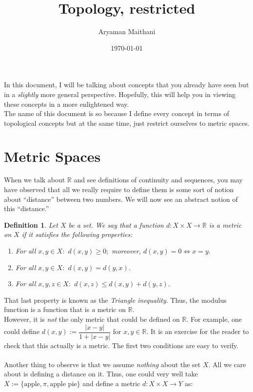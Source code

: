 \documentclass[12pt]{article}
\title{Topology, restricted}
\author{Aryaman Maithani}
\date{\today}
\newtheorem{defn}{Definition}
\newcounter{exercise}
\begin{document}
\maketitle
\hrulefill

In this document, I will be talking about concepts that you already have seen but in a \emph{slightly} more general perspective. Hopefully, this will help you in viewing these concepts in a more enlightened way.\\
The name of this document is so because I define every concept in terms of topological concepts but at the same time, just restrict ourselves to metric spaces.\\
\section{Metric Spaces}
	When we talk about $\mathbb{R}$ and see definitions of continuity and sequences, you may have observed that all we really require to define them is some sort of notion about ``distance'' between two numbers. We will now see an abstract notion of this ``distance.''
	\begin{defn}
		Let $X$ be a set. We say that a function $d:X\times X \to \mathbb{R}$ is a \emph{metric} on $X$ if it satisfies the following properties:
		\begin{enumerate} 
			\item For all $x, y \in X:$ $d(x, y) \ge 0;$ moreover, $d(x, y) = 0 \iff x = y.$
			\item For all $x, y \in X:$ $d(x, y) = d(y, x).$
			\item For all $x, y, z \in X:$ $d(x, z) \le d(x, y) + d(y, z).$
		\end{enumerate}
	\end{defn}
	That last property is known as the \emph{Triangle inequality.}
	Thus, the modulus function is a function that is \emph{a} metric on $\mathbb{R}.$\\
	However, it is \emph{not} the only metric that could be defined on $\mathbb{R}.$ For example, one could define $d(x, y) := \dfrac{|x-y|}{1 + |x-y|}$ for $x, y \in \mathbb{R}.$ It is an exercise for the reader to check that this actually is a metric. The first two conditions are easy to verify.\\~\\
	Another thing to observe is that we assume \emph{nothing} about the set $X.$ All we care about is defining a distance on it. Thus, one could very well take $X := \{\text{apple}, \pi, \text{apple pie}\}$ and define a metric $d:X \times X \to Y$ as:
\end{document}
